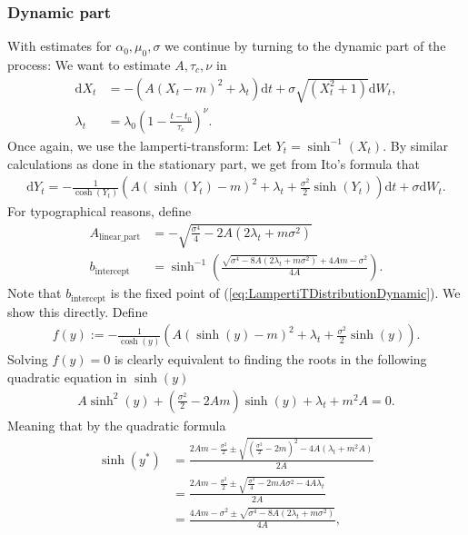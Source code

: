 \subsubsection{Dynamic part}
With estimates for $\alpha_0, \mu_0, \sigma$ we continue by turning to the dynamic part of the process: We want to estimate $A, \tau_c, \nu$ in
\begin{align}
    \mathrm{d}X_t &= -\left(A(X_t - m)^2 + \lambda_t\right)\mathrm{d}t + \sigma \sqrt{\left(X_t^2 + 1\right)}\mathrm{d}W_t,\\
    \lambda_t &= \lambda_0 \left(1 - \frac{t - t_0}{\tau_c}\right)^\nu.
\end{align}
Once again, we use the lamperti-transform: Let $Y_t = \sinh^{-1}(X_t)$. By similar calculations as done in the stationary part, we get from Ito's formula that
\begin{align}
    \mathrm{d}Y_t = -\frac{1}{\cosh(Y_t)}\left(A\left(\sinh(Y_t) - m\right)^2 + \lambda_t + \frac{\sigma^2}{2}\sinh(Y_t)\right)\mathrm{d}t + \sigma \mathrm{d}W_t. \label{eq:LampertiTDistributionDynamic}
\end{align}
For typographical reasons, define
\begin{align}
    A_{\textrm{linear\_part}} &= -\sqrt{\frac{\sigma^4}{4} - 2A\left(2\lambda_t + m\sigma^2\right)}\\
    b_{\textrm{intercept}} &= \sinh^{-1}\left(\frac{\sqrt{\sigma^4 - 8A\left(2\lambda_t + m \sigma^2\right)} + 4 Am - \sigma^2}{4A}\right).
\end{align}
Note that $b_{\textrm{intercept}}$ is the fixed point of (\ref{eq:LampertiTDistributionDynamic}). We show this directly. Define
\begin{align}
    f(y) := -\frac{1}{\cosh(y)}\left(A\left(\sinh(y) - m\right)^2 + \lambda_t + \frac{\sigma^2}{2}\sinh(y)\right).
\end{align}
Solving $f(y) = 0$ is clearly equivalent to finding the roots in the following quadratic equation in $\sinh(y)$
\begin{align}
    A\sinh^2(y) + \left(\frac{\sigma^2}{2} - 2Am\right)\sinh(y) + \lambda_t + m^2A = 0.
\end{align}
Meaning that by the quadratic formula
\begin{align}
    \sinh(y^*) &= \frac{2Am-\frac{\sigma^2}{2}\pm\sqrt{\left(\frac{\sigma^2}{2} - 2m\right)^2 - 4A\left(\lambda_t + m^2 A\right)}}{2A}\nonumber\\
    &= \frac{2Am-\frac{\sigma^2}{2}\pm\sqrt{\frac{\sigma^4}{4}-2mA\sigma^2 - 4A\lambda_t}}{2A}\nonumber\\
    &= \frac{4Am-\sigma^2\pm\sqrt{\sigma^4-8A\left(2\lambda_t + m\sigma^2\right)}}{4A},
\end{align}
